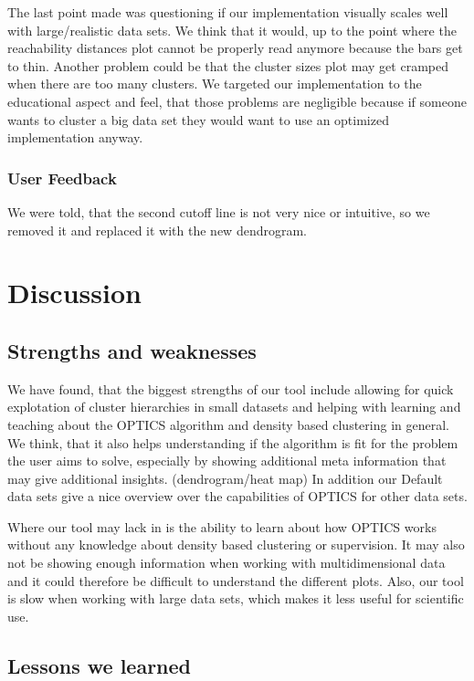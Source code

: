 \documentclass{vgtc} %
\begin{document}
The last point made was questioning if our implementation visually scales well with large/realistic data sets. We think that it would, up to the point where the reachability distances plot cannot be properly read anymore because the bars get to thin. Another problem could be that the cluster sizes plot may get cramped when there are too many clusters. We targeted our implementation to the educational aspect and feel, that those problems are negligible because if someone wants to cluster a big data set they would want to use an optimized implementation anyway.

\subsubsection{User Feedback}
We were told, that the second cutoff line is not very nice or intuitive, so we removed it and replaced it with the new dendrogram.

\section{Discussion}

\subsection{Strengths and weaknesses}
We have found, that the biggest strengths of our tool include allowing for quick explotation of cluster hierarchies in small datasets and helping with learning and teaching about the OPTICS algorithm and density based clustering in general. We think, that it also helps understanding if the algorithm is fit for the problem the user aims to solve, especially by showing additional meta information that may give additional insights. (dendrogram/heat map) In addition our Default data sets give a nice overview over the capabilities of OPTICS for other data sets.

Where our tool may lack in is the ability to learn about how OPTICS works without any knowledge about density based clustering or supervision. It may also not be showing enough information when working with multidimensional data and it could therefore be difficult to understand the different plots. Also, our tool is slow when working with large data sets, which makes it less useful for scientific use.

\subsection{Lessons we learned}
\end{document}
